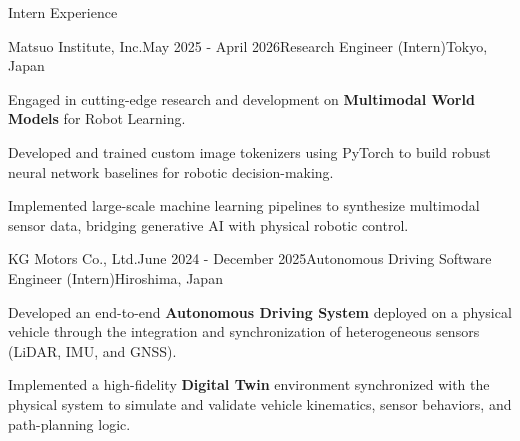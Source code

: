 \documentclass{resume} %
\begin{document}
\begin{rSection}{Intern Experience}

  \begin{rSubsection}{Matsuo Institute, Inc.}{May 2025 - April 2026}{Research Engineer (Intern)}{Tokyo, Japan}
    \item Engaged in cutting-edge research and development on \textbf{Multimodal World Models} for Robot Learning.
    \item Developed and trained custom image tokenizers using PyTorch to build robust neural network baselines for robotic decision-making.
    \item Implemented large-scale machine learning pipelines to synthesize multimodal sensor data, bridging generative AI with physical robotic control.
  \end{rSubsection}

  \begin{rSubsection}{KG Motors Co., Ltd.}{June 2024 - December 2025}{Autonomous Driving Software Engineer (Intern)}{Hiroshima, Japan}
    \item Developed an end-to-end \textbf{Autonomous Driving System} deployed on a physical vehicle through the integration and synchronization of heterogeneous sensors (LiDAR, IMU, and GNSS).
    \item Implemented a high-fidelity \textbf{Digital Twin} environment synchronized with the physical system to simulate and validate vehicle kinematics, sensor behaviors, and path-planning logic.
  \end{rSubsection}

\end{rSection}
\end{document}
